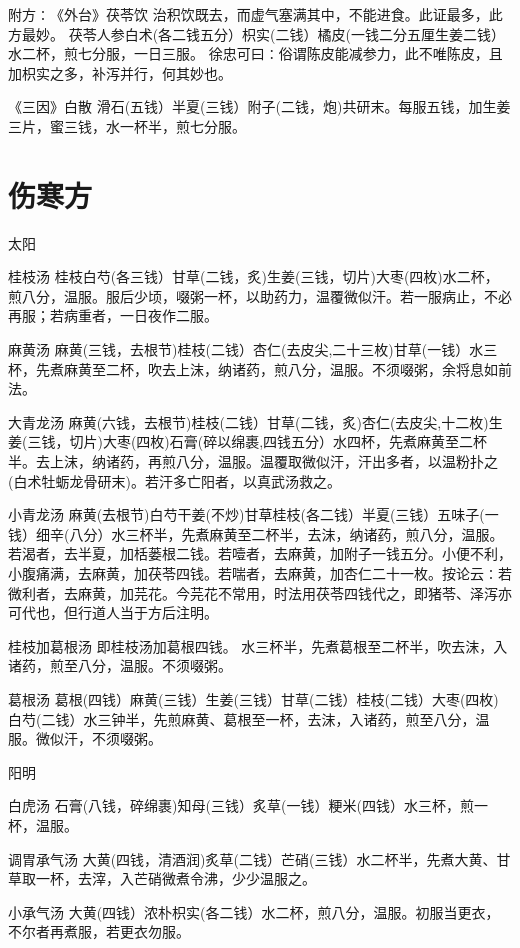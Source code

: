 \documentclass[a4paper,12pt,UTF8,twoside]{ctexbook}
\begin{document}
	附方∶《外台》茯苓饮
	治积饮既去，而虚气塞满其中，不能进食。此证最多，此方最妙。
	茯苓人参白术(各二钱五分）枳实(二钱）橘皮(一钱二分五厘生姜二钱）水二杯，煎七分服，一日三服。
	徐忠可曰∶俗谓陈皮能减参力，此不唯陈皮，且加枳实之多，补泻并行，何其妙也。
	
	《三因》白散
	滑石(五钱）半夏(三钱）附子(二钱，炮)共研末。每服五钱，加生姜三片，蜜三钱，水一杯半，煎七分服。
	
	\chapter{伤寒方}
	太阳	
	
	桂枝汤
	桂枝白芍(各三钱）甘草(二钱，炙)生姜(三钱，切片)大枣(四枚)水二杯，煎八分，温服。服后少顷，啜粥一杯，以助药力，温覆微似汗。若一服病止，不必再服；若病重者，一日夜作二服。
	
	麻黄汤
	麻黄(三钱，去根节)桂枝(二钱）杏仁(去皮尖,二十三枚)甘草(一钱）水三杯，先煮麻黄至二杯，吹去上沫，纳诸药，煎八分，温服。不须啜粥，余将息如前法。
	
	大青龙汤
	麻黄(六钱，去根节)桂枝(二钱）甘草(二钱，炙)杏仁(去皮尖,十二枚)生姜(三钱，切片)大枣(四枚)石膏(碎以绵裹,四钱五分）水四杯，先煮麻黄至二杯半。去上沫，纳诸药，再煎八分，温服。温覆取微似汗，汗出多者，以温粉扑之(白术牡蛎龙骨研末)。若汗多亡阳者，以真武汤救之。
	
	小青龙汤
	麻黄(去根节)白芍干姜(不炒)甘草桂枝(各二钱）半夏(三钱）五味子(一钱）细辛(八分）水三杯半，先煮麻黄至二杯半，去沫，纳诸药，煎八分，温服。若渴者，去半夏，加栝蒌根二钱。若噎者，去麻黄，加附子一钱五分。小便不利，小腹痛满，去麻黄，加茯苓四钱。若喘者，去麻黄，加杏仁二十一枚。按论云∶若微利者，去麻黄，加芫花。今芫花不常用，时法用茯苓四钱代之，即猪苓、泽泻亦可代也，但行道人当于方后注明。
	
	桂枝加葛根汤
	即桂枝汤加葛根四钱。
	水三杯半，先煮葛根至二杯半，吹去沫，入诸药，煎至八分，温服。不须啜粥。
	
	葛根汤
	葛根(四钱）麻黄(三钱）生姜(三钱）甘草(二钱）桂枝(二钱）大枣(四枚)白芍(二钱）水三钟半，先煎麻黄、葛根至一杯，去沫，入诸药，煎至八分，温服。微似汗，不须啜粥。
	
	
	阳明	
	
	白虎汤
	石膏(八钱，碎绵裹)知母(三钱）炙草(一钱）粳米(四钱）水三杯，煎一杯，温服。
	
	调胃承气汤
	大黄(四钱，清酒润)炙草(二钱）芒硝(三钱）水二杯半，先煮大黄、甘草取一杯，去滓，入芒硝微煮令沸，少少温服之。
	
	小承气汤
	大黄(四钱）浓朴枳实(各二钱）水二杯，煎八分，温服。初服当更衣，不尔者再煮服，若更衣勿服。
	
\end{document}
